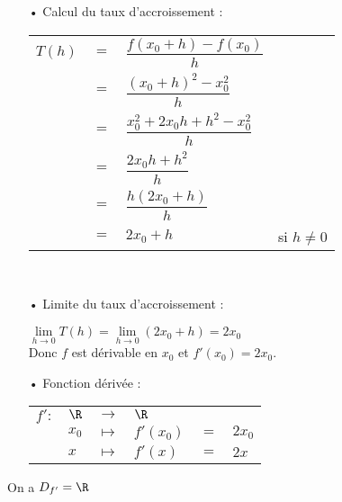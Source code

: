 \begin{itemize}
\item[•] Calcul du taux d'accroissement : \vspace*{.3cm}
\\
\begin{tabular}{llll}
$T(h)$ & $=$ & $\dfrac{f(x_0 + h) - f(x_0)}{h}$ & \vspace*{.3cm} \\
& $=$ & $\dfrac{\left(x_0 + h\right)^2 - x_0^2}{h}$ & \vspace*{.3cm} \\
& $=$ & $\dfrac{x_0^2 + 2x_0h + h^2 - x_0^2}{h}$ & \vspace*{.3cm} \\
& $=$ & $\dfrac{2x_0h + h^2}{h}$ & \vspace*{.3cm} \\
& $=$ & $\dfrac{h\left(2x_0 + h\right)}{h}$ & \vspace*{.3cm} \\
& $=$ & $2x_0 + h$ & si $h \neq 0$ \\
\end{tabular} \\
\vspace*{.3cm}

\item[•] Limite du taux d'accroissement : \vspace*{.3cm}

$\lim\limits_{h \to 0} T(h) = \lim\limits_{h \to 0} (2x_0 + h) = 2x_0$ \vspace*{.3cm} \\

Donc $f$ est dérivable en $x_0$ et $f'(x_0) = 2x_0$. \\

\item[•] Fonction dérivée : \\

\begin{tabular}{llllll}
$f' :$ & $\R$ & $\longrightarrow$ & $\R$ & & \\
& $x_0$ & $\longmapsto$ & $f'(x_0)$ & $ = $ & $2x_0$ \\
& $x$ & $\longmapsto$ & $f'(x)$ & $ = $ & $2x$ \\
\end{tabular}
\end{itemize}

\vspace*{.3cm}

On a $D_{f'} = \R$

